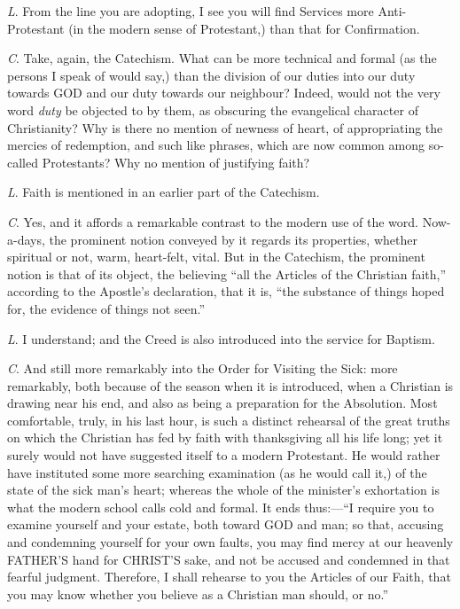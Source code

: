 \emph{L}. From the line you are adopting, I see
you will find Services more Anti-Protestant (in the modern sense
of Protestant,) than that for Confirmation.

\emph{C}. Take, again, the Catechism. What can be
more technical and formal (as the persons I speak of would say,) than
the division of our duties into our duty towards GOD
and our duty towards our neighbour? Indeed, would not the very word \emph{duty}
be objected to by them, as obscuring the evangelical character of
Christianity? Why is there no mention of newness of heart, of
appropriating the mercies of redemption, and such like phrases, which
are now common among so-called Protestants? Why no mention of
justifying faith?

\emph{L}. Faith is mentioned in an earlier part
of the Catechism.

\emph{C}. Yes, and it affords a remarkable
contrast to the modern use of the word. Now-a-days, the prominent
notion conveyed by it regards its properties, whether spiritual or
not, warm, heart-felt, vital. But in the Catechism, the prominent
notion is that of its object, the believing ``all the Articles of the
Christian faith,'' according to the Apostle's declaration, that it is, ``the
substance of things hoped for, the evidence of things not seen.''

\emph{L}. I understand; and the Creed is also
introduced into the service for Baptism.

\emph{C}. And still more remarkably into the
Order for Visiting the Sick: more remarkably, both because of the
season when it is introduced, when a Christian is drawing near his
end, and also as being a preparation for the Absolution. Most
comfortable, truly, in his last hour, is such a distinct rehearsal of
the great truths on which the Christian has fed by faith with
thanksgiving all his life long; yet it surely would not have suggested
itself to a modern Protestant. He would rather have instituted some
more searching examination (as he would call it,) of the state of
the sick man's heart; whereas the whole of the minister's exhortation
is what the modern school calls cold and formal. It ends thus:—``I
require you to examine yourself and your estate, both toward GOD
and man; so that, accusing and condemning yourself for your own
faults, you may find mercy at our heavenly FATHER'S
hand for CHRIST'S sake, and not
be accused and condemned in that fearful judgment. Therefore, I shall
rehearse to you the Articles of our Faith, that you may know whether
you believe as a Christian man should, or no.''


